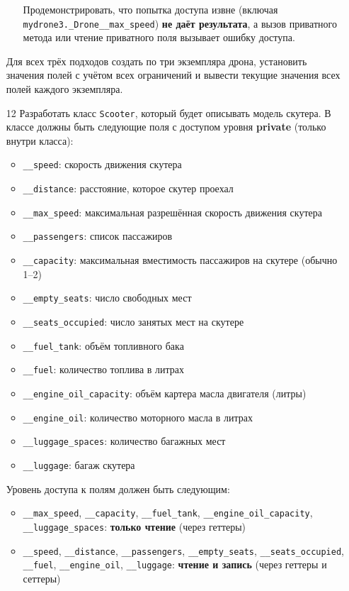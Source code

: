 \begin{enumerate}
\begin{enumerate}
    Продемонстрировать, что попытка доступа извне (включая \texttt{mydrone3.\_Drone\_\_max\_speed}) \textbf{не даёт результата}, а вызов приватного метода или чтение приватного поля вызывает ошибку доступа.
\end{enumerate}
Для всех трёх подходов создать по три экземпляра дрона, установить значения полей с учётом всех ограничений и вывести текущие значения всех полей каждого экземпляра.
\item[12] Разработать класс \texttt{Scooter}, который будет описывать модель скутера. В классе должны быть следующие поля с доступом уровня \textbf{private} (только внутри класса):
\begin{itemize}
    \item \texttt{\_\_speed}: скорость движения скутера  
    \item \texttt{\_\_distance}: расстояние, которое скутер проехал  
    \item \texttt{\_\_max\_speed}: максимальная разрешённая скорость движения скутера  
    \item \texttt{\_\_passengers}: список пассажиров  
    \item \texttt{\_\_capacity}: максимальная вместимость пассажиров на скутере (обычно 1–2)  
    \item \texttt{\_\_empty\_seats}: число свободных мест  
    \item \texttt{\_\_seats\_occupied}: число занятых мест на скутере  
    \item \texttt{\_\_fuel\_tank}: объём топливного бака  
    \item \texttt{\_\_fuel}: количество топлива в литрах  
    \item \texttt{\_\_engine\_oil\_capacity}: объём картера масла двигателя (литры)  
    \item \texttt{\_\_engine\_oil}: количество моторного масла в литрах  
    \item \texttt{\_\_luggage\_spaces}: количество багажных мест  
    \item \texttt{\_\_luggage}: багаж скутера  
\end{itemize}
Уровень доступа к полям должен быть следующим:
\begin{itemize}
    \item \texttt{\_\_max\_speed}, \texttt{\_\_capacity}, \texttt{\_\_fuel\_tank}, \texttt{\_\_engine\_oil\_capacity}, \texttt{\_\_luggage\_spaces}: \textbf{только чтение} (через геттеры)  
    \item \texttt{\_\_speed}, \texttt{\_\_distance}, \texttt{\_\_passengers}, \texttt{\_\_empty\_seats}, \texttt{\_\_seats\_occupied}, \texttt{\_\_fuel}, \texttt{\_\_engine\_oil}, \texttt{\_\_luggage}: \textbf{чтение и запись} (через геттеры и сеттеры)

\end{itemize}
\end{enumerate}
